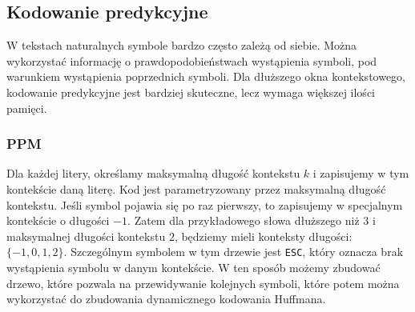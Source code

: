 \documentclass{../notatki}
\begin{document}
\subsection{Kodowanie predykcyjne}

W tekstach naturalnych symbole bardzo często zależą od siebie.
Można wykorzystać
informację o prawdopodobieństwach wystąpienia symboli, pod
warunkiem wystąpienia
poprzednich symboli. Dla dłuższego okna kontekstowego, kodowanie predykcyjne
jest bardziej skuteczne, lecz wymaga większej ilości pamięci.

\subsubsection{PPM}

Dla każdej litery, określamy maksymalną długość kontekstu $k$ i zapisujemy
w tym kontekście daną literę. Kod jest parametryzowany przez
maksymalną długość
kontekstu. Jeśli symbol pojawia się po raz
pierwszy, to zapisujemy w specjalnym kontekście o długości $-1$.
Zatem dla przykładowego słowa dłuższego niż $3$ i
maksymalnej długości kontekstu $2$, będziemy mieli konteksty
długości: $\{-1, 0, 1, 2\}$.
Szczególnym symbolem w tym drzewie jest
\texttt{ESC}, który oznacza brak wystąpienia symbolu w danym
kontekście. W ten sposób możemy zbudować drzewo, które pozwala na
przewidywanie kolejnych symboli, które potem można wykorzystać do
zbudowania dynamicznego kodowania Huffmana.
\end{document}

